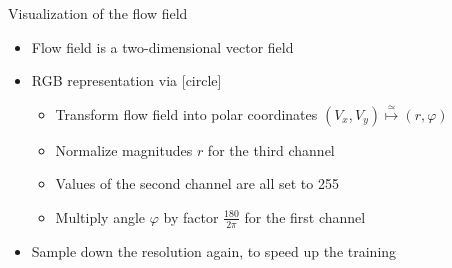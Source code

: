 \begin{frame}{Visualization of the flow field}
\begin{itemize}
\item Flow field is a two-dimensional vector field
\item RGB representation via
[circle]
\begin{itemize}
\item Transform flow field into polar coordinates $(V_x,V_y) \overset{\simeq}{\mapsto} (r, \varphi)$
\item Normalize magnitudes $r$ for the third channel
\item Values of the second channel are all set to 255
\item Multiply angle $\varphi$ by factor $\frac{180}{2\pi}$ for the first channel
\end{itemize}
\item Sample down the resolution again, to speed up the training
\end{itemize}


\end{frame}
